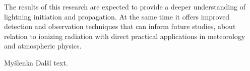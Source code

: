The results of this research are expected to provide a deeper understanding of lightning initiation and propagation. At the same time it offers improved detection and observation techniques that can inform future studies, about relation to ionizing radiation with direct practical applications in meteorology and atmospheric physics.

\sec Myšlenka
Další text.
\bye
